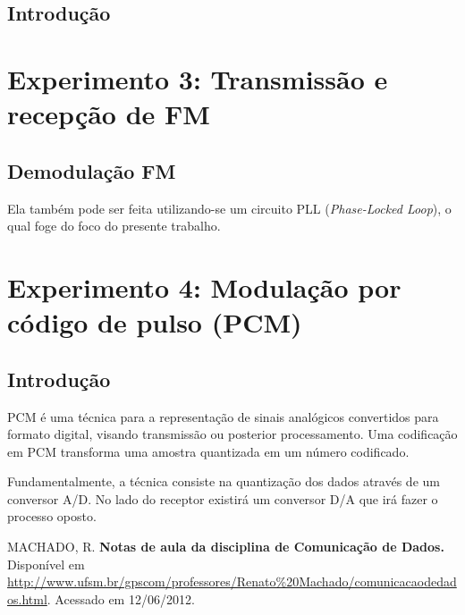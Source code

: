 \documentclass[]{report}
\begin{document}
\section{Introdução}
\chapter{Experimento 3: Transmissão e recepção de FM}
\section{Demodulação FM}
Ela também pode ser feita utilizando-se um circuito PLL (\textit{Phase-Locked Loop}), o qual foge do foco do presente trabalho.
\chapter{Experimento 4: Modulação por código de pulso (PCM)}
\section{Introdução}
PCM é uma técnica para a representação de sinais analógicos convertidos para formato digital, visando transmissão ou posterior processamento. Uma codificação em PCM transforma uma amostra quantizada em um número codificado. \cite{renatodatacom}

Fundamentalmente, a técnica consiste na quantização dos dados através de um conversor A/D. No lado do receptor existirá um conversor D/A que irá fazer o processo oposto.


\begin{thebibliography}{100}
 MACHADO, R. 
 \textbf{Notas de aula da disciplina de Comunicação de Dados.}
 Disponível em \url{http://www.ufsm.br/gpscom/professores/Renato\%20Machado/comunicacaodedados.html}. Acessado em 12/06/2012.
\end{thebibliography}
\end{document}
